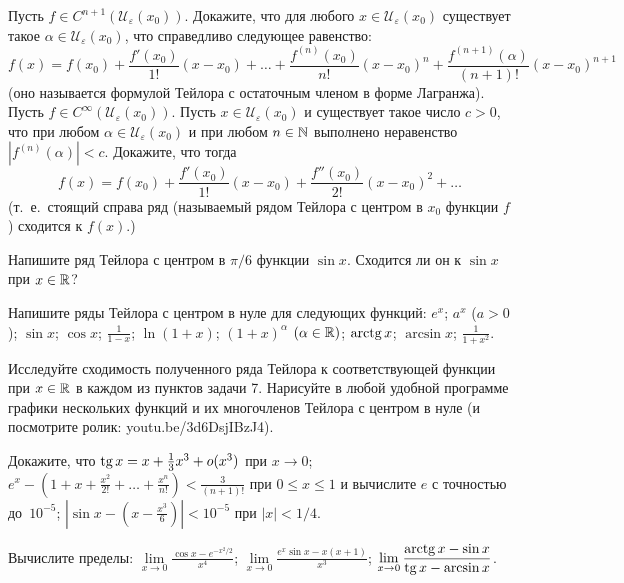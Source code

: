 \documentclass[a4paper, 11pt]{article}
\newcommand{\0}[1]{\overline{#1}}
\def\U{{\mathcal U}}
\begin{document}
Пусть $f\in C^{n+1}(\U_\varepsilon(x_0))$.
Докажите, что для любого $x\in\U_\varepsilon(x_0)$
существует такое $\alpha\in\U_\varepsilon(x_0)$,
что справедливо следующее равенство:
$$f(x)=f(x_0)+\frac{f'(x_0)}{1!}(x-x_0)+%
\dots+
\frac{f^{(n)}(x_0)}{n!}(x-x_0)^n
+
\frac{f^{(n+1)}(\alpha)}{(n+1)!}(x-x_0)^{n+1}$$
(оно называется формулой Тейлора с остаточным членом в форме Лагранжа).\\
Пусть $f\in C^{\infty}(\U_\varepsilon(x_0))$.
Пусть $x\in\U_\varepsilon(x_0)$ и существует такое число $c>0$, что
при любом $\alpha\in\U_\varepsilon(x_0)$
и при любом $n\in\mathbb{N}$
выполнено неравенство
$|f^{(n)}(\alpha)|<c$. Докажите, что тогда
$$f(x)=f(x_0)+\frac{f'(x_0)}{1!}(x-x_0)+\frac{f''(x_0)}{2!}(x-x_0)^2+\dots$$
(т.~е.~стоящий справа ряд
(называемый рядом Тейлора
с центром в $x_0$
функции $f$)
сходится к $f(x)$.)

 Напишите ряд Тейлора с центром в $\pi/6$  функции $\sin x$.
Сходится ли он к $\sin x$ при $x\in\mathbb{R}$?


 Напишите ряды Тейлора с центром в нуле для следующих функций:\quad
{}
 $e^x$;
 $a^x$ ($a>0$);
 $\sin x$;
 $\cos x$;
 $\frac1{1-x}$;
 $\ln(1+x)$;
 $(1+x)^\alpha$ $(\alpha\in\mathbb{R})$;
 $\arctg x$;
 $\arcsin x$;
 $\frac1{1+x^2}$.


 Исследуйте сходимость полученного ряда Тейлора к соответствующей функции
при $x\in\mathbb{R}$ в каждом из пунктов задачи 7.
 Нарисуйте в любой удобной программе графики нескольких функций и их многочленов Тейлора с центром в нуле (и посмотрите ролик: youtu.be/3d6DsjIBzJ4).

Докажите, что  $\tg x=x+\frac13x^3+o(x^3)$ при $x\rightarrow0$;
$e^x-(1+x+\frac{x^2}{2!}+\dots+\frac{x^n}{n!})<\frac3{(n+1)!}$
при $0\leqslant x\leqslant 1$ и вычислите $e$ с точностью до~$10^{-5}$;
  $|\sin x -(x-\frac{x^3}6)|<10^{-5}$ при $|x|<1/4$.




 Вычислите пределы:
$\displaystyle\lim\limits_{x\rightarrow 0}\frac{\cos x -e^{-x^2/2}}{x^4}$;
$\displaystyle\lim\limits_{x\rightarrow 0}\frac{e^x\sin x -x(x+1)}{x^3}$;
$\displaystyle\lim\limits_{x\rightarrow 0}\frac{\arctg x -\sin x}{\tg x-\arcsin x}$.
\end{document}
